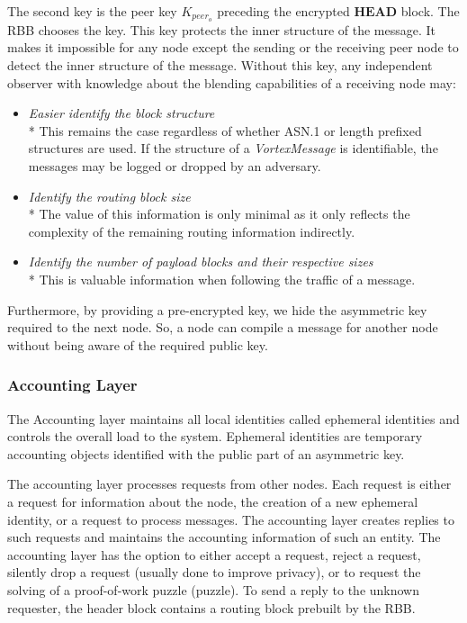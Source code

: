 \documentclass[acmsmall, screen]{acmart}
\begin{document}
The second key is the peer key $K_{peer_o}$ preceding the encrypted $\mathbf{HEAD}$ block. The RBB chooses the key. This key protects the inner structure of the message. It makes it impossible for any node except the sending or the receiving peer node to detect the inner structure of the message. Without this key, any independent observer with knowledge about the blending capabilities of a receiving node may:
\begin{itemize}
	\item \emph{Easier identify the block structure}\\*
	This remains the case regardless of whether ASN.1 or length prefixed structures are used. If the structure of a \emph{VortexMessage} is identifiable, the messages may be logged or dropped by an adversary.
	\item \emph{Identify the routing block size}\\*
	The value of this information is only minimal as it only reflects the complexity of the remaining routing information indirectly.
	\item \emph{Identify the number of payload blocks and their respective sizes}\\*
	This is valuable information when following the traffic of a message.
\end{itemize}

Furthermore, by providing a pre-encrypted key, we hide the asymmetric key required to the next node. So, a node can compile a message for another node without being aware of the required public key.

\subsubsection{Accounting Layer}
The Accounting layer maintains all local identities called ephemeral identities and controls the overall load to the system. Ephemeral identities are temporary accounting objects identified with the public part of an asymmetric key. 

The accounting layer processes requests from other nodes. Each request is either a request for information about the node, the creation of a new ephemeral identity, or a request to process messages. The accounting layer creates replies to such requests and maintains the accounting information of such an entity. The accounting layer has the option to either accept a request, reject a request, silently drop a request (usually done to improve privacy), or to request the solving of a proof-of-work puzzle (puzzle). To send a reply to the unknown requester, the header block contains a routing block prebuilt by the RBB.
\end{document}
